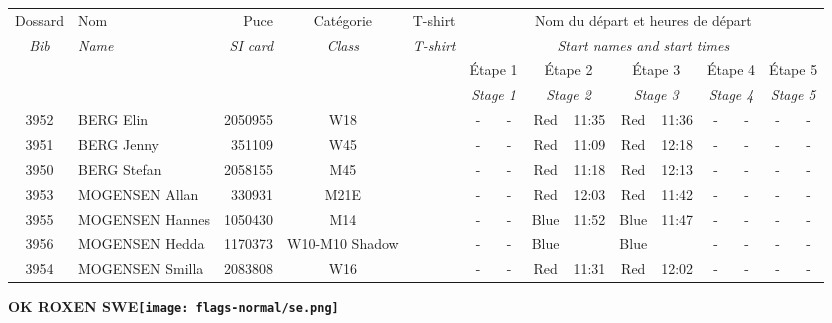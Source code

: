 \documentclass{report}
\begin{document}
  \begin{longtable}{|c|l|r|c|c|*{5}{cc|}}
    Dossard & Nom  & Puce    & Catégorie & T-shirt & \multicolumn{10}{c|}{Nom du départ et heures de départ} \\
    \itshape Bib     & \itshape Name & \itshape SI card & \itshape Class  & \itshape  T-shirt  & \multicolumn{10}{c|}{\itshape Start names and start times} \\
    \hline
    & & & & & \multicolumn{2}{c|}{Étape 1} & \multicolumn{2}{c|}{Étape 2} & \multicolumn{2}{c|}{Étape 3} & \multicolumn{2}{c|}{Étape 4} & \multicolumn{2}{c|}{Étape 5} \\
    & & & & & \multicolumn{2}{c|}{\itshape Stage 1} & \multicolumn{2}{c|}{\itshape Stage 2} & \multicolumn{2}{c|}{\itshape Stage 3} & \multicolumn{2}{c|}{\itshape Stage 4} & \multicolumn{2}{c|}{\itshape Stage 5} \\
    \hline
    3952 & BERG Elin & 2050955 & W18 &   & - &  - & Red & 11:35 & Red & 11:36 & - &  - & - &  -\\
    3951 & BERG Jenny & 351109 & W45 &   & - &  - & Red & 11:09 & Red & 12:18 & - &  - & - &  -\\
    3950 & BERG Stefan & 2058155 & M45 &   & - &  - & Red & 11:18 & Red & 12:13 & - &  - & - &  -\\
    3953 & MOGENSEN Allan & 330931 & M21E &   & - &  - & Red & 12:03 & Red & 11:42 & - &  - & - &  -\\
    3955 & MOGENSEN Hannes & 1050430 & M14 &   & - &  - & Blue & 11:52 & Blue & 11:47 & - &  - & - &  -\\
    3956 & MOGENSEN Hedda & 1170373 & W10-M10 Shadow &   & - &  - & Blue &   & Blue &   & - &  - & - &  -\\
    3954 & MOGENSEN Smilla & 2083808 & W16 &   & - &  - & Red & 11:31 & Red & 12:02 & - &  - & - &  -\\
  \end{longtable}
\newpage
  \Huge \centering \bfseries OK ROXEN  SWE\normalfont \footnotesize \sffamily \hfill \texttt{[image: flags-normal/se.png]} \newline 
\end{document}
